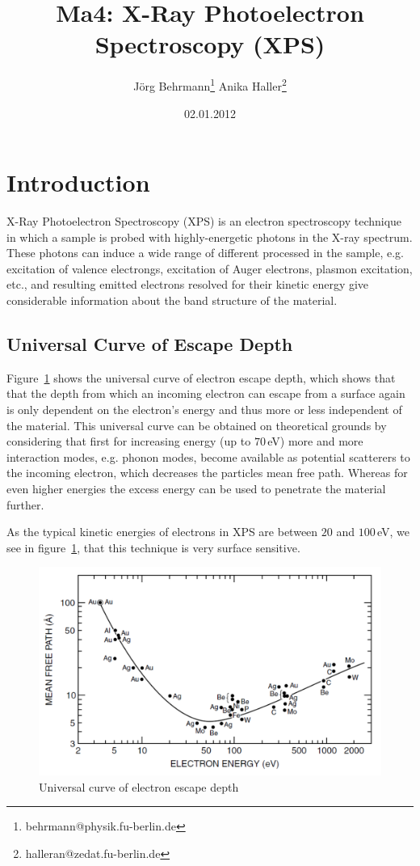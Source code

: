 \documentclass[a4paper,10pt]{scrartcl}
\begin{document}
\title{Ma4: X-Ray Photoelectron Spectroscopy (XPS)}
\author{J\"org Behrmann\footnote{behrmann@physik.fu-berlin.de} \qquad Anika Haller\footnote{halleran@zedat.fu-berlin.de}}
\date{02.01.2012}
\maketitle
\tableofcontents
\thispagestyle{empty}

\section{Introduction}

X-Ray Photoelectron Spectroscopy (XPS) is an electron spectroscopy technique in which a sample is probed with highly-energetic photons in the X-ray spectrum. These photons can induce a wide range of different processed in the sample, e.g. excitation of valence electrongs, excitation of Auger electrons, plasmon excitation, etc., and resulting emitted electrons resolved for their kinetic energy give considerable information about the band structure of the material.

\subsection{Universal Curve of Escape Depth}

Figure~\ref{fig:ucurve} shows the universal curve of electron escape depth, which shows that that the depth from which an incoming electron can escape from a surface again is only dependent on the electron's energy and thus more or less independent of the material. This universal curve can be obtained on theoretical grounds by considering that first for increasing energy (up to $70\,$eV) more and more interaction modes, e.g. phonon modes, become available as potential scatterers to the incoming electron, which decreases the particles mean free path. Whereas for even higher energies the excess energy can be used to penetrate the material further.

As the typical kinetic energies of electrons in XPS are between $20$ and $100\,$eV, we see in figure~\ref{fig:ucurve}, that this technique is very surface sensitive.

\begin{figure}
\centering
\includegraphics[scale=0.4]{img/ucurve}
\caption{Universal curve of electron escape depth \label{fig:ucurve}}
\end{figure}
\end{document}

